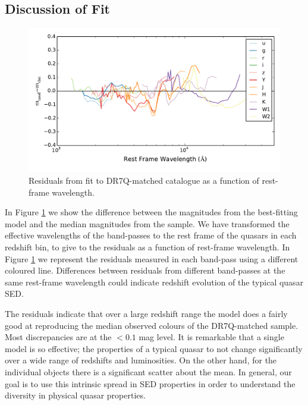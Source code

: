 \subsection{Discussion of Fit}

\begin{figure}
  \centering
  \includegraphics[width=\textwidth]{figures/chapter06/residuals_nocorr}
  \caption{Residuals from fit to DR7Q-matched catalogue as a function of rest-frame wavelength.}
  \label{fig:residuals}
\end{figure}

In Figure \ref{fig:residuals} we show the difference between the magnitudes from the best-fitting model and the median magnitudes from the sample. We have transformed the effective wavelengths of the band-passes to the rest frame of the quasars in each redshift bin, to give to the residuals as a function of rest-frame wavelength. In Figure \ref{fig:residuals} we represent the residuals measured in each band-pass using a different coloured line. Differences between residuals from different band-passes at the same rest-frame wavelength could indicate redshift evolution of the typical quasar SED. 

The residuals indicate that over a large redshift range the model does a fairly good at reproducing the median observed colours of the DR7Q-matched sample. Most discrepancies are at the $<0.1$ mag level. 
It is remarkable that a single model is so effective; the properties of a typical quasar to not change significantly over a wide range of redshifts and luminosities. On the other hand, for the individual objects there is a significant scatter about the mean. In general, our goal is to use this intrinsic spread in SED properties in order to understand the diversity in physical quasar properties. 

